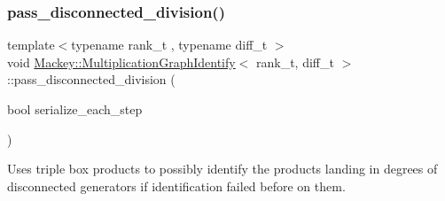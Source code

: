 \subsubsection{\texorpdfstring{pass\+\_\+disconnected\+\_\+division()}{pass\_disconnected\_division()}}
{\footnotesize\ttfamily template$<$typename rank\+\_\+t , typename diff\+\_\+t $>$ \\
void \hyperlink{classMackey_1_1MultiplicationGraphIdentify}{Mackey\+::\+Multiplication\+Graph\+Identify}$<$ rank\+\_\+t, diff\+\_\+t $>$\+::pass\+\_\+disconnected\+\_\+division (\begin{DoxyParamCaption}\item[{bool}]{serialize\+\_\+each\+\_\+step }\end{DoxyParamCaption})\hspace{0.3cm}{\ttfamily [protected]}}



Uses triple box products to possibly identify the products landing in degrees of disconnected generators if identification failed before on them. 

